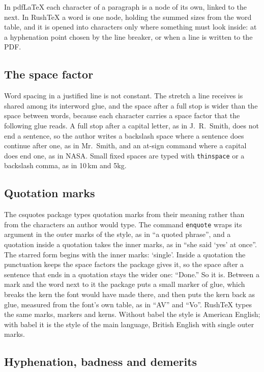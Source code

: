 \documentclass{article}
\numberwithin{equation}{section}
\theoremstyle{definition}
\theoremstyle{remark}
\begin{document}
In pdfLaTeX each character of a paragraph is a node of its own, linked to the next. In
RushTeX a word is one node, holding the summed sizes from the word table, and it is
opened into characters only where something must look inside: at a hyphenation point
chosen by the line breaker, or when a line is written to the PDF.

\subsection{The space factor}

Word spacing in a justified line is not constant. The stretch a line receives is shared
among its interword glue, and the space after a full stop is wider than the space
between words, because each character carries a space factor that the following glue
reads. A full stop after a capital letter, as in J.~R.\ Smith, does not end a sentence,
so the author writes a backslash space where a sentence does continue after one, as in
Mr.\ Smith, and an at-sign command where a capital does end one, as in NASA\@. Small
fixed spaces are typed with \texttt{thinspace} or a backslash comma, as in
10\,km and 5\thinspace kg.

\subsection{Quotation marks}\label{sec:quotes}

The csquotes package types quotation marks from their meaning rather than from the
characters an author would type. The command \texttt{enquote} wraps its argument in
the outer marks of the style, as in \enquote{a quoted phrase}, and a quotation inside
a quotation takes the inner marks, as in \enquote{she said \enquote{yes} at once}. The
starred form begins with the inner marks: \enquote*{single}. Inside a quotation the
punctuation keeps the space factors the package gives it, so the space after a sentence
that ends in a quotation stays the wider one: \enquote{Done.} So it is. Between a mark and
the word next to it the package puts a small marker of glue, which breaks the kern the
font would have made there, and then puts the kern back as glue, measured from the
font's own table, as in \enquote{AV} and \enquote{Vo}. RushTeX types the same marks,
markers and kerns. Without babel the style is American English; with babel it is the
style of the main language, British English with single outer marks.

\subsection{Hyphenation, badness and demerits}
\end{document}
